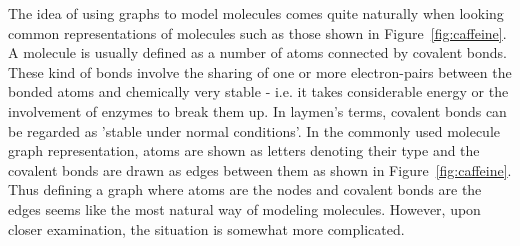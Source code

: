The idea of using graphs to model molecules comes quite naturally when looking common representations of molecules such as those shown in Figure~\ref{fig:caffeine}. A molecule is usually defined as a number of atoms connected by covalent bonds. These kind of bonds involve the sharing of one or more electron-pairs between the bonded atoms and chemically very stable - i.e. it takes considerable energy or the involvement of enzymes to break them up. In laymen's terms, covalent bonds can be regarded as 'stable under normal conditions'. In the commonly used molecule graph representation, atoms are shown as letters denoting their type and the covalent bonds are drawn as edges between them as shown in Figure~\ref{fig:caffeine}. Thus defining a graph where atoms are the nodes and covalent bonds are the edges seems like the most natural way of modeling molecules. However, upon closer examination, the situation is somewhat more complicated.


